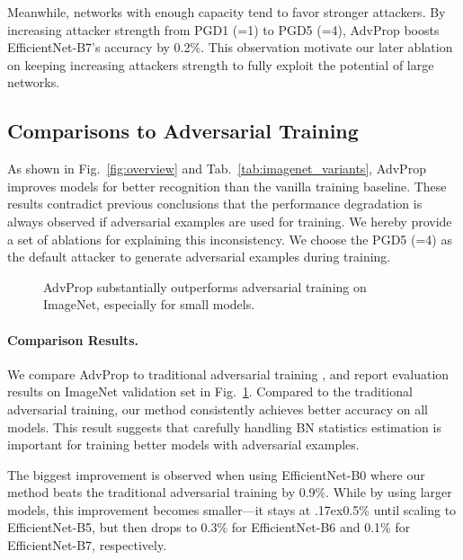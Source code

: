 \documentclass[10pt,twocolumn,letterpaper]{article}
\newcommand{\app}{\raise.17ex\hbox{}}
\begin{document}
Meanwhile, networks with enough capacity tend to favor stronger attackers. By increasing attacker strength from PGD1 (=1) to PGD5 (=4), AdvProp boosts EfficientNet-B7's accuracy by 0.2\%. This observation motivate our later ablation on keeping increasing attackers strength to fully exploit the potential of large networks.


\subsection{Comparisons to Adversarial Training}
\label{sec:when_adv}
As shown in Fig.~\ref{fig:overview} and Tab.~\ref{tab:imagenet_variants}, AdvProp improves models for better recognition than the vanilla training baseline. These results contradict previous conclusions \cite{Kurakin2017,Tramer2018,Kannan2018} that the performance degradation is always observed if adversarial examples are used for training. We hereby provide a set of ablations for explaining this inconsistency. We choose the PGD5 (=4) as the default attacker to generate adversarial examples during training.


\begin{figure}[h!]
\centering
\vspace{-.5em}
\caption{AdvProp substantially outperforms adversarial training \cite{Goodfellow2015} on ImageNet, especially for small models.}
\label{fig:AT_and_AR} 
\vspace{-1em}
\end{figure}



\paragraph{Comparison Results.} 
We compare AdvProp to traditional adversarial training \cite{Goodfellow2015}, and
report evaluation results on ImageNet validation set in Fig.~\ref{fig:AT_and_AR}. Compared to the traditional adversarial training, our method consistently achieves better accuracy on all models. This result suggests that carefully handling BN statistics estimation is important for training better models with adversarial examples.

The biggest improvement is observed when using EfficientNet-B0 where our method beats the traditional adversarial training by 0.9\%. While by using larger models, this improvement becomes smaller---it stays at  \app0.5\% until scaling to EfficientNet-B5, but then drops to 0.3\% for EfficientNet-B6 and 0.1\% for EfficientNet-B7, respectively. 
\end{document}

